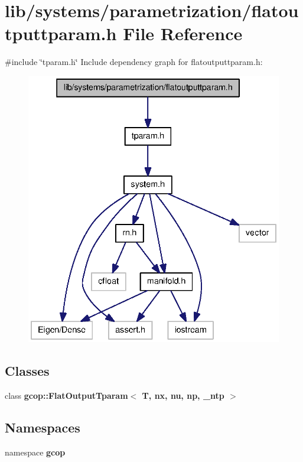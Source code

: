 \section{lib/systems/parametrization/flatoutputtparam.h \-File \-Reference}
\label{flatoutputtparam_8h}
{\ttfamily \#include \char`\"{}tparam.\-h\char`\"{}}\*
\-Include dependency graph for flatoutputtparam.\-h\-:
\nopagebreak
\begin{figure}[H]
\begin{center}
\leavevmode
\includegraphics[width=336pt]{flatoutputtparam_8h__incl}
\end{center}
\end{figure}
\subsection*{\-Classes}
\begin{DoxyCompactItemize}
\item 
class {\bf gcop\-::\-Flat\-Output\-Tparam$<$ T, nx, nu, np, \-\_\-ntp $>$}
\end{DoxyCompactItemize}
\subsection*{\-Namespaces}
\begin{DoxyCompactItemize}
\item 
namespace {\bf gcop}
\end{DoxyCompactItemize}
